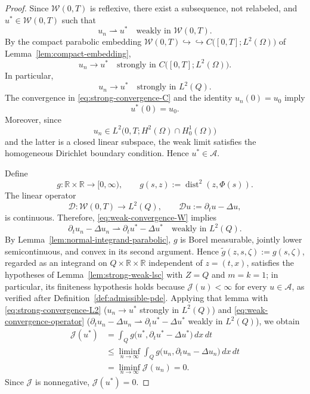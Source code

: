 \documentclass[11pt]{elsarticle}
\theoremstyle{definition}
\theoremstyle{remark}
\numberwithin{equation}{section}
\begin{document}
\begin{proof}
		Since $\mathcal{W}(0,T)$ is reflexive, there exist a subsequence,
		not relabeled, and $u^\ast\in\mathcal{W}(0,T)$ such that
		\begin{equation}
		u_n\rightharpoonup u^\ast
		\quad\text{weakly in }\mathcal{W}(0,T).
		\label{eq:weak-convergence-W}
		\end{equation}
		By the compact parabolic embedding	$\mathcal{W}(0,T)
		\hookrightarrow\hookrightarrow
		C\bigl([0,T];L^2(\Omega)\bigr)$ of
		Lemma~\ref{lem:compact-embedding},
		\begin{equation}
		u_n\longrightarrow u^\ast
		\quad\text{strongly in }
		C\bigl([0,T];L^2(\Omega)\bigr).
		\label{eq:strong-convergence-C}
		\end{equation}
		In particular,
		\begin{equation}
		u_n\longrightarrow u^\ast
		\quad\text{strongly in }L^2(Q).
		\label{eq:strong-convergence-L2}
		\end{equation}
		The convergence in \eqref{eq:strong-convergence-C} and the identity
		$u_n(0)=u_0$ imply
		\[
		u^\ast(0)=u_0.
		\]
		Moreover, since
		\[
		u_n\in L^2\bigl(0,T;H^2(\Omega)\cap H_0^1(\Omega)\bigr)
		\]
		and the latter is a closed linear subspace, the weak limit satisfies
		the homogeneous Dirichlet boundary condition. Hence
		$u^\ast\in\mathcal{A}$.
		
		Define
		\[
		g:\mathbb{R}\times\mathbb{R}\longrightarrow[0,\infty),
		\qquad
		g(s,z):=\operatorname{dist}^2(z,\Phi(s)).
		\]
		The linear operator
		\[
		\mathcal{D}:
		\mathcal{W}(0,T)\longrightarrow L^2(Q),
		\qquad
		\mathcal{D}u:=\partial_tu-\Delta u,
		\]
		is continuous. Therefore, \eqref{eq:weak-convergence-W} implies
		\begin{equation}
		\partial_tu_n-\Delta u_n
		\rightharpoonup
		\partial_tu^\ast-\Delta u^\ast
		\quad\text{weakly in }L^2(Q).
		\label{eq:weak-convergence-operator}
		\end{equation}
		By Lemma~\ref{lem:normal-integrand-parabolic}, $g$ is Borel
		measurable, jointly lower semicontinuous, and convex in its second
		argument. Hence $\widetilde g(z,s,\zeta):=g(s,\zeta)$, regarded as an
		integrand on $Q\times\mathbb{R}\times\mathbb{R}$ independent of
		$z=(t,x)$, satisfies the hypotheses of
		Lemma~\ref{lem:strong-weak-lsc} with $Z=Q$ and $m=k=1$; in
		particular, its finiteness hypothesis holds because
		$\mathcal{J}(u)<\infty$ for every $u\in\mathcal{A}$, as verified
		after Definition~\ref{def:admissible-pde}. Applying
		that lemma with \eqref{eq:strong-convergence-L2}
		($u_n\to u^\ast$ strongly in $L^2(Q)$) and
		\eqref{eq:weak-convergence-operator}
		($\partial_t u_n-\Delta u_n\rightharpoonup
		\partial_t u^\ast-\Delta u^\ast$ weakly in $L^2(Q)$), we obtain
		\[
		\begin{aligned}
			\mathcal{J}(u^\ast)
			&=
			\int_Q
			g\bigl(
			u^\ast,
			\partial_tu^\ast-\Delta u^\ast
			\bigr)\,dx\,dt
			\\
			&\leq
			\liminf_{n\to\infty}
			\int_Q
			g\bigl(
			u_n,
			\partial_tu_n-\Delta u_n
			\bigr)\,dx\,dt
			\\
			&=
			\liminf_{n\to\infty}
			\mathcal{J}(u_n)
			=
			0.
		\end{aligned}
		\]
		Since $\mathcal{J}$ is nonnegative, $\mathcal{J}(u^\ast)=0$. 
		

\end{proof}
\end{document}
